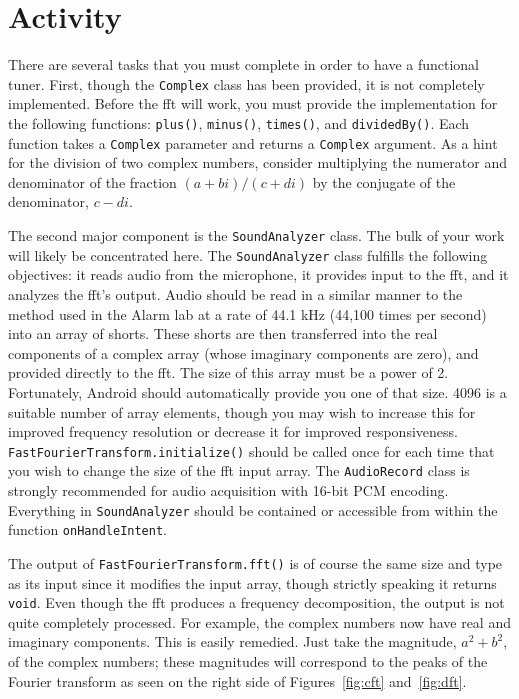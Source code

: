 \section{Activity}

There are several tasks that you must complete in order to have a functional tuner.
First, though the \verb=Complex= class has been provided, it is not completely implemented.
Before the \ac{fft} will work, you must provide the implementation for the following functions: \verb=plus()=, \verb=minus()=, \verb=times()=, and \verb=dividedBy()=.
Each function takes a \verb=Complex= parameter and returns a \verb=Complex= argument.
As a hint for the division of two complex numbers, consider multiplying the numerator and denominator of the fraction 
\begin{math}
(a+bi) / (c+di)
\end{math} 
 by the conjugate of the  denominator, $c-di$.

The second major component is the \verb=SoundAnalyzer= class.
The bulk of your work will likely be concentrated here.
The \verb=SoundAnalyzer= class fulfills the following objectives: it reads audio from the microphone, it provides input to the \ac{fft}, and it analyzes the \ac{fft}'s output.
Audio should be read in a similar manner to the method used in the Alarm lab at a rate of 44.1 kHz (44,100 times per second) into an array of shorts.
These shorts are then transferred into the real components of a complex array (whose imaginary components are zero), and provided directly to the \ac{fft}.
The size of this array must be a power of 2. 
Fortunately, Android should automatically provide you one of that size.
4096 is a suitable number of array elements, though you may wish to increase this for improved frequency resolution or decrease it for improved responsiveness.
\verb=FastFourierTransform.initialize()= should be called once for each time that you wish to change the size of the \ac{fft} input array.
The \verb=AudioRecord= class is strongly recommended for audio acquisition with 16-bit PCM encoding.
Everything in \verb=SoundAnalyzer= should be contained or accessible from within the function \verb=onHandleIntent=.

The output of \verb=FastFourierTransform.fft()= is of course the same size and type as its input since it modifies the input array, though strictly speaking it returns \verb=void=.
Even though the \ac{fft} produces a frequency decomposition, the output is not quite completely processed.
For example, the complex numbers now have real and imaginary components. 
This is easily remedied.
Just take the magnitude, $a^2 + b^2$, of the complex numbers; these magnitudes will correspond to the peaks of the Fourier transform as seen on the right side of Figures~\ref{fig:cft} and~\ref{fig:dft}.

